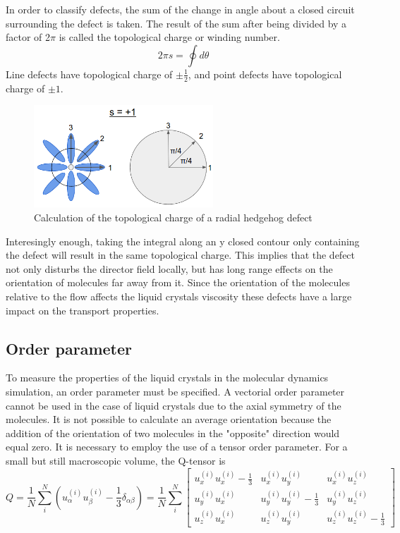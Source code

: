 \documentclass[preprint, aps]{revtex4-1}
\begin{document}
In order to classify defects, the sum of the change in angle about a closed 
circuit surrounding the defect is taken. The result of the sum after being 
divided by a factor of 2$\pi$ is called the topological charge or winding 
number.
	\begin{equation} \label{topological-charge}
		2\pi s = \oint d\theta
	\end{equation}
Line defects have topological charge of $\pm\frac{1}{2}$, and point defects have
 topological charge of $\pm1$. 
	\begin{figure}
		\centering
		\includegraphics[width=0.6\textwidth]{circuit-calc.png}
		\caption{Calculation of the topological charge of a radial hedgehog
		defect}
		\label{fig:circuit}
	\end{figure}
Interesingly enough, taking the integral along an
y closed contour only containing the defect will result in the same topological 
charge. This implies that the defect not only disturbs the director field 
locally, but has long range effects on the orientation of molecules far away 
from it. Since the orientation of the molecules relative to the flow affects the
liquid crystals viscosity these defects have a large impact on the transport
properties.


\subsection*{Order parameter}
To measure the properties of the liquid crystals in the molecular dynamics 
simulation, an order parameter must be specified. A vectorial order parameter 
cannot be used in the case of liquid crystals due to the axial symmetry of the 
molecules. It is not possible to calculate an average orientation because the 
addition of the orientation of two molecules in the "opposite" direction would 
equal zero. It is necessary to employ the use of a tensor order parameter. For 
a small but still macroscopic volume, the Q-tensor is
	\begin{equation} \label{q-tensor}
		Q = \frac{1}{N} \sum_{i}^{N} 
		(u_{\alpha}^{(i)} u_{\beta}^{(i)} - \frac{1}{3}\delta_{\alpha\beta})
		= \frac{1}{N} \sum_{i}^{N}
		\begin{bmatrix}
			u_x^{(i)}u_x^{(i)} - \frac{1}{3} 
			& u_x^{(i)}u_y^{(i)} 
			& u_x^{(i)}u_z^{(i)} \\

			u_y^{(i)}u_x^{(i)} 
			& u_y^{(i)}u_y^{(i)} - \frac{1}{3} 
			& u_y^{(i)}u_z^{(i)} \\

			u_z^{(i)}u_x^{(i)} 
			& u_z^{(i)}u_y^{(i)} 
			& u_z^{(i)}u_z^{(i)} - \frac{1}{3}
		\end{bmatrix}
	\end{equation}
\end{document}
